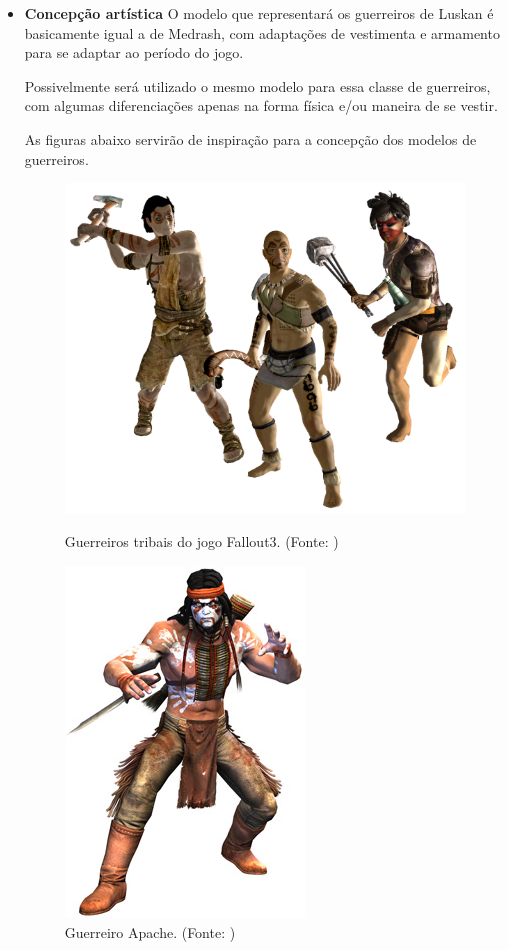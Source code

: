 \begin{itemize}
\item{\bf Concepção artística}
O modelo que representará os guerreiros de Luskan é basicamente igual a de Medrash, com adaptações de vestimenta e armamento para se adaptar ao período do jogo.

Possivelmente será utilizado o mesmo modelo para essa classe de guerreiros, com algumas diferenciações apenas na forma física e/ou maneira de se vestir.

As figuras abaixo servirão de inspiração para a concepção dos modelos de guerreiros.
\newpage
 \begin{figure}[H]
 \centering
 \includegraphics[scale=0.5]{Imagens/guerreiro01.png}
 \caption{Guerreiros tribais do jogo Fallout3. (Fonte:  \cite{bib:guerreiro01})}
\label{img:guerreiro01}
 \centering
 \includegraphics[scale=0.5]{Imagens/guerreiro02.png}
 \caption{Guerreiro Apache. (Fonte: \cite{bib:guerreiro02})}
\end{figure}
\end{itemize}


